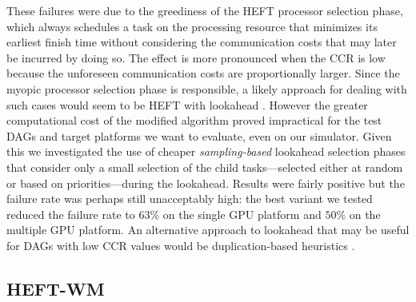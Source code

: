 \documentclass[runningheads]{llncs}
\begin{document}
These failures were due to the greediness of the HEFT processor selection phase, which always schedules a task on the processing resource that minimizes its earliest finish time without considering the communication costs that may later be incurred by doing so. The effect is more pronounced when the CCR is low because the unforeseen communication costs are proportionally larger. Since the myopic processor selection phase is responsible, a likely approach for dealing with such cases would seem to be HEFT with lookahead \cite{bittencourt10}. However the greater computational cost of the modified algorithm proved impractical for the test DAGs and target platforms we want to evaluate, even on our simulator. Given this we investigated the use of cheaper {\em sampling-based} lookahead selection phases that consider only a small selection of the child tasks---selected either at random or based on priorities---during the lookahead. Results were fairly positive but the failure rate was perhaps still unacceptably high: the best variant we tested reduced the failure rate to $63\%$ on the single GPU platform and $50\%$ on the multiple GPU platform. An alternative approach to lookahead that may be useful for DAGs with low CCR values would be duplication-based heuristics \cite{duplication}.    



\subsection{HEFT-WM}
\label{subsect.heft_WM}
\end{document}
